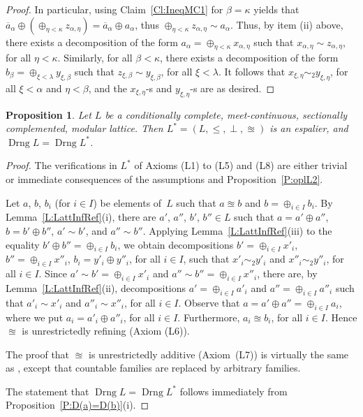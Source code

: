 \documentclass[psamsfonts,reqno]{memo-l}
\theoremstyle{plain}
\newtheorem{proposition}[lemma]{Proposition}
\theoremstyle{definition}
\theoremstyle{remark}
\numberwithin{equation}{section}
\newcommand{\oll}[1]{\overline{#1}}
\DeclareMathOperator{\Drng}{Drng}
\begin{document}
\begin{proof}
In particular, using Claim~\ref{Cl:IneqMC1} for $\beta=\kappa$ yields that
$\oll{a}_\alpha\oplus(\oplus_{\eta<\kappa}z_{\alpha,\eta})=
\oll{a}_{\alpha}\oplus a_{\alpha}$, thus
$\oplus_{\eta<\kappa}z_{\alpha,\eta}\sim a_{\alpha}$. Thus, by item (ii)
above, there exists a decomposition of the form
$a_{\alpha}=\oplus_{\eta<\kappa}x_{\alpha,\eta}$ such that
$x_{\alpha,\eta}\sim z_{\alpha,\eta}$, for all $\eta<\kappa$. Similarly, for
all $\beta<\kappa$, there exists a decomposition of the form
$b_{\beta}=\oplus_{\xi<\lambda}y_{\xi,\beta}$ such that
$z_{\xi,\beta}\sim y_{\xi,\beta}$, for all $\xi<\lambda$. It follows that
$x_{\xi,\eta}\sim_2y_{\xi,\eta}$,
for all $\xi<\alpha$ and $\eta<\beta$, and
the $x_{\xi,\eta}$-s and $y_{\xi,\eta}$-s are as desired.
\end{proof}

\begin{proposition}\label{P:L2L*esp}
Let $L$ be a conditionally complete, meet-continuous, sectionally
complemented, modular
 lattice. Then
$L^*=(L,\leq,\perp,\approxeq)$ is an espalier,
and\index{Dzzrng@$\Drng L$}
$\Drng L=\Drng L^*$.
\end{proposition}

\begin{proof}
The verifications in $L^*$ of Axioms (L1) to (L5) and (L8) are either
trivial or immediate consequences of the assumptions and
Proposition~\ref{P:oplL2}.

Let $a$, $b$, $b_i$ (for $i\in I$) be elements of~$L$ such that $a\approxeq b$
and $b=\oplus_{i\in I}b_i$. By Lemma~\ref{L:LattInfRef}(i), there are $a'$,
$a''$, $b'$, $b''\in L$ such that $a=a'\oplus a''$, $b=b'\oplus b''$,
$a'\sim b'$, and $a''\sim b''$. Applying Lemma~\ref{L:LattInfRef}(iii) to
the equality $b'\oplus b''=\oplus_{i\in I}b_i$, we obtain decompositions
$b'=\oplus_{i\in I}x'_i$, $b''=\oplus_{i\in I}x''_i$, $b_i=y'_i\oplus y''_i$,
for all $i\in I$, such that $x'_i\sim_2y'_i$ and $x''_i\sim_2y''_i$,
for all
$i\in I$. Since $a'\sim b'=\oplus_{i\in I}x'_i$ and
$a''\sim b''=\oplus_{i\in I}x''_i$, there are, by
Lemma~\ref{L:LattInfRef}(ii), decompositions $a'=\oplus_{i\in I}a'_i$ and
$a''=\oplus_{i\in I}a''_i$ such that $a'_i\sim x'_i$ and $a''_i\sim x''_i$,
for all $i\in I$. Observe that $a=a'\oplus a''=\oplus_{i\in I}a_i$, where we
put $a_i=a'_i\oplus a''_i$, for all $i\in I$. Furthermore, $a_i\approxeq b_i$,
for all $i\in I$. Hence $\approxeq$ is unrestrictedly refining
 (Axiom (L6)).

The proof that $\approxeq$ is unrestrictedly additive
 (Axiom~(L7)) is
virtually the same as \cite[Proposition~13.9]{WDim},
except that countable families are replaced by arbitrary families.

The statement that\index{Dzzrng@$\Drng L$} $\Drng L=\Drng L^*$ follows
immediately from Proposition~\ref{P:D(a)=D(b)}(i).
\end{proof}
\end{document}
